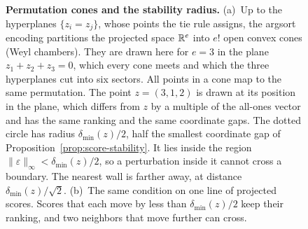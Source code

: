 \begin{figure}[!htbp]
\caption{\textbf{Permutation cones and the stability radius.} (a)~Up to the hyperplanes $\{z_i=z_j\}$, whose points the tie rule assigns, the argsort encoding partitions the projected space $\mathbb{R}^e$ into $e!$ open convex cones (Weyl chambers). They are drawn here for $e=3$ in the plane $z_1+z_2+z_3=0$, which every cone meets and which the three hyperplanes cut into six sectors. All points in a cone map to the same permutation. The point $z=(3,1,2)$ is drawn at its position in the plane, which differs from $z$ by a multiple of the all-ones vector and has the same ranking and the same coordinate gaps. The dotted circle has radius $\delta_{\min}(z)/2$, half the smallest coordinate gap of Proposition~\ref{prop:score-stability}. It lies inside the region $\|\varepsilon\|_\infty<\delta_{\min}(z)/2$, so a perturbation inside it cannot cross a boundary. The nearest wall is farther away, at distance $\delta_{\min}(z)/\sqrt2$. (b)~The same condition on one line of projected scores. Scores that each move by less than $\delta_{\min}(z)/2$ keep their ranking, and two neighbors that move further can cross.}
\label{fig:cones}
\end{figure}
